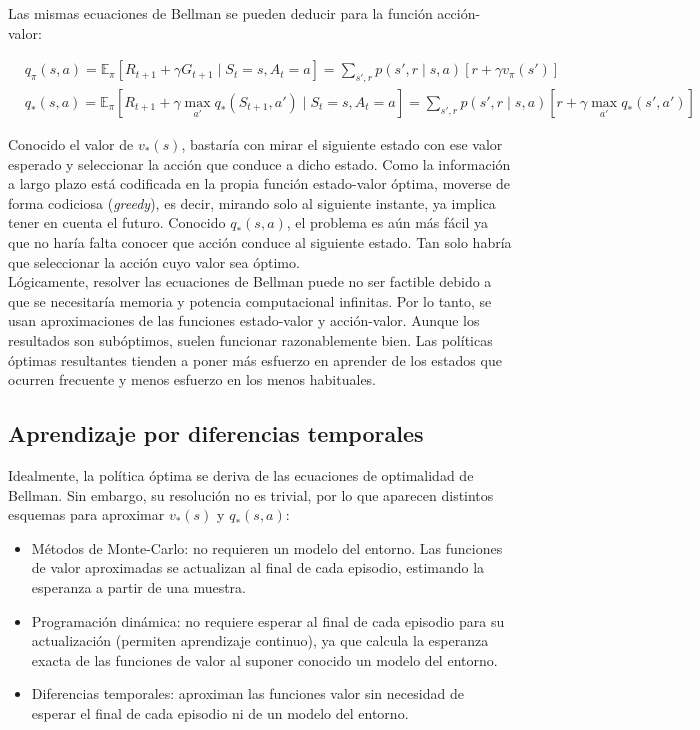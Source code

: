 \documentclass[11pt,a4paper]{article}
\begin{document}
		Las mismas ecuaciones de Bellman se pueden deducir para la función acción-valor:
		
		\begin{align}
		& q_{\pi}(s,a) = \mathbb{E}_\pi[R_{t+1} + \gamma G_{t+1} \mid S_t = s, A_t = a] = \sum_{s',r} p(s', r \mid s, a) \left[ r + \gamma v_{\pi}(s') \right] \\
		& q_*(s,a) = \mathbb{E}_\pi[R_{t+1} + \gamma \max_{a'} q_*(S_{t+1}, a') \mid S_t = s, A_t = a] = \sum_{s',r} p(s', r \mid s, a) \left[ r + \gamma \max_{a'} q_*(s',a') \right]
		\end{align}
		
		Conocido el valor de $v_*(s)$, bastaría con mirar el siguiente estado con ese valor esperado y seleccionar la acción que conduce a dicho estado. Como la información a largo plazo está codificada en la propia función estado-valor óptima, moverse de forma codiciosa (\textit{greedy}), es decir, mirando solo al siguiente instante, ya implica tener en cuenta el futuro. Conocido $q_*(s,a)$, el problema es aún más fácil ya que no haría falta conocer que acción conduce al siguiente estado. Tan solo habría que seleccionar la acción cuyo valor sea óptimo. \\
		
		Lógicamente, resolver las ecuaciones de Bellman puede no ser factible debido a que se necesitaría memoria y potencia computacional infinitas. Por lo tanto, se usan aproximaciones de las funciones estado-valor y acción-valor. Aunque los resultados son subóptimos, suelen funcionar razonablemente bien. Las políticas óptimas resultantes tienden a poner más esfuerzo en aprender de los estados que ocurren frecuente y menos esfuerzo en los menos habituales.
		
		\subsection{Aprendizaje por diferencias temporales}
		Idealmente, la política óptima se deriva de las ecuaciones de optimalidad de Bellman. Sin embargo, su resolución no es trivial, por lo que aparecen distintos esquemas para aproximar $v_*(s)$ y $q_*(s,a)$:
		
		\begin{itemize}
			\item Métodos de Monte-Carlo: no requieren un modelo del entorno. Las funciones de valor aproximadas se actualizan al final de cada episodio, estimando la esperanza a partir de una muestra.
			\item Programación dinámica: no requiere esperar al final de cada episodio para su actualización (permiten aprendizaje continuo), ya que calcula la esperanza exacta de las funciones de valor al suponer conocido un modelo del entorno.
			\item Diferencias temporales: aproximan las funciones valor sin necesidad de esperar el final de cada episodio ni de un modelo del entorno.
		\end{itemize}
		
\end{document}
